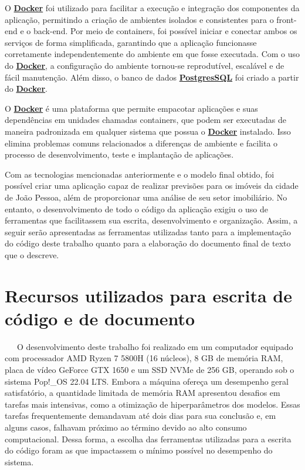 \documentclass[
  12pt,
  a4paper,
]{scrreprt}
\begin{document}
\vspace{12pt}

O \href{https://www.docker.com/}{\textbf{Docker}} foi utilizado para
facilitar a execução e integração dos componentes da aplicação,
permitindo a criação de ambientes isolados e consistentes para o
front-end e o back-end. Por meio de containers, foi possível iniciar e
conectar ambos os serviços de forma simplificada, garantindo que a
aplicação funcionasse corretamente independentemente do ambiente em que
fosse executada. Com o uso do
\href{https://www.docker.com/}{\textbf{Docker}}, a configuração do
ambiente tornou-se reprodutível, escalável e de fácil manutenção. Além
disso, o banco de dados
\href{https://www.postgresql.org/}{\textbf{PostgresSQL}} foi criado a
partir do \href{https://www.docker.com/}{\textbf{Docker}}.

\vspace{12pt}

O \href{https://www.docker.com/}{\textbf{Docker}} é uma plataforma que
permite empacotar aplicações e suas dependências em unidades chamadas
containers, que podem ser executadas de maneira padronizada em qualquer
sistema que possua o \href{https://www.docker.com/}{\textbf{Docker}}
instalado. Isso elimina problemas comuns relacionados a diferenças de
ambiente e facilita o processo de desenvolvimento, teste e implantação
de aplicações.

\vspace{12pt}

Com as tecnologias mencionadas anteriormente e o modelo final obtido,
foi possível criar uma aplicação capaz de realizar previsões para os
imóveis da cidade de João Pessoa, além de proporcionar uma análise de
seu setor imobiliário. No entanto, o desenvolvimento de todo o código da
aplicação exigiu o uso de ferramentas que facilitassem sua escrita,
desenvolvimento e organização. Assim, a seguir serão apresentadas as
ferramentas utilizadas tanto para a implementação do código deste
trabalho quanto para a elaboração do documento final de texto que o
descreve.

\section{Recursos utilizados para escrita de código e de
documento}\label{recursos-utilizados-para-escrita-de-cuxf3digo-e-de-documento}

~~~O desenvolvimento deste trabalho foi realizado em um computador
equipado com processador AMD Ryzen 7 5800H (16 núcleos), 8 GB de memória
RAM, placa de vídeo GeForce GTX 1650 e um SSD NVMe de 256 GB, operando
sob o sistema Pop!\_OS 22.04 LTS. Embora a máquina ofereça um desempenho
geral satisfatório, a quantidade limitada de memória RAM apresentou
desafios em tarefas mais intensivas, como a otimização de
hiperparâmetros dos modelos. Essas tarefas frequentemente demandavam até
dois dias para sua conclusão e, em alguns casos, falhavam próximo ao
término devido ao alto consumo computacional. Dessa forma, a escolha das
ferramentas utilizadas para a escrita do código foram as que impactassem
o mínimo possível no desempenho do sistema.
\end{document}
